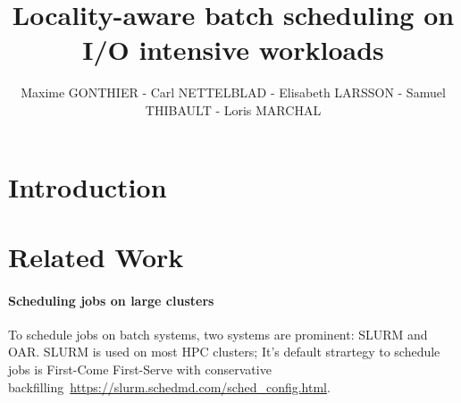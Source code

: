 \documentclass[conference,10pt]{IEEEtran}
\begin{document}
\title{Locality-aware batch scheduling on I/O intensive workloads}

\author{Maxime GONTHIER - Carl NETTELBLAD - Elisabeth LARSSON - Samuel THIBAULT - Loris MARCHAL}

\maketitle

\begin{abstract}

\end{abstract}


\section{Introduction}\label{sec.introduction}

\section{Related Work}\label{sec.related_work}

\paragraph{Scheduling jobs on large clusters}

To schedule jobs on batch systems, two systems are prominent: SLURM and OAR. 
SLURM is used on most HPC clusters; It's default strartegy to schedule jobs is 
First-Come First-Serve with conservative backfilling~\url{https://slurm.schedmd.com/sched_config.html}.
\end{document}
